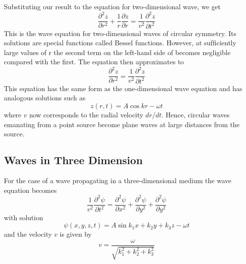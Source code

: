 \documentclass[../../../main.tex]{subfiles}
\begin{document}
Substituting our result to the equation for two-dimensional wave, we get
\begin{equation*}
    \frac{\partial^2 z}{\partial r^2}+\frac{1}{r}\frac{\partial z}{\partial r}=\frac{1}{v^2}\frac{\partial^2 z}{\partial t^2}
\end{equation*}
This is the wave equation for two-dimensional waves of circular symmetry. Its solutions are special functions called Bessel functions. However, at sufﬁciently large values of r the second term on the left-hand side of becomes negligible compared with the ﬁrst. The equation then approximates to
\begin{equation*}
    \frac{\partial^2 z}{\partial r^2}=\frac{1}{v^2}\frac{\partial^2 z}{\partial t^2}
\end{equation*}
This equation has the same form as the one-dimensional wave equation and has analogous solutions such as
\begin{equation*}
    z(r,t)=A\cos kr-\omega t
\end{equation*}
where $v$ now corresponds to the radial velocity $dr/dt$. Hence, circular waves emanating from a point source become plane waves at large distances from the source.

\subsection*{Waves in Three Dimension}
For the case of a wave propagating in a three-dimensional medium the wave equation becomes
\begin{equation*}
    \frac{1}{v^2}\frac{\partial^2 \psi}{\partial t^2}=  \frac{\partial^2 \psi}{\partial x^2} + \frac{\partial^2 \psi}{\partial y^2} + \frac{\partial^2 \psi}{\partial y^2}
\end{equation*}
with solution
\begin{equation*}
    \psi(x,y,z,t)=A\sin k_1x+k_2y+k_3z-\omega t
\end{equation*}
and the velocity $v$ is given by
\begin{equation*}
    v=\frac{\omega}{\sqrt{k_1^2+k_2^2+k_3^2}}
\end{equation*}
\end{document}
